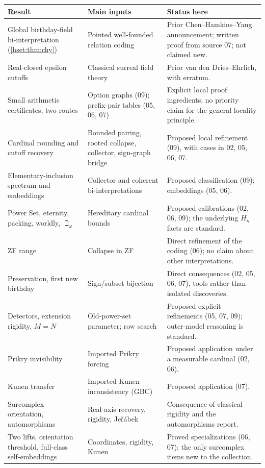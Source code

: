 \documentclass[11pt,letterpaper]{article}
\theoremstyle{definition}
\theoremstyle{remark}
\begin{document}
\begin{longtable}{@{}P{0.26\textwidth}P{0.34\textwidth}P{0.32\textwidth}@{}}
\toprule
Result & Main inputs & Status here\\
\midrule\endhead
Global birthday-field bi-interpretation (\cref{hset:thm:chy}) & Pointed well-founded relation coding & Prior Chen--Hamkins--Yang announcement; written proof from source 07; not claimed new.\\[0.4em]
Real-closed epsilon cutoffs & Classical surreal field theory & Prior van den Dries--Ehrlich, with erratum.\\[0.4em]
Small arithmetic certificates, two routes & Option graphs (09); prefix-pair tables (05, 06, 07) & Explicit local proof ingredients; no priority claim for the general locality principle.\\[0.4em]
Cardinal rounding and cutoff recovery & Bounded pairing, rooted collapse, collector, sign-graph bridge & Proposed local refinement (09), with cases in 02, 05, 06, 07.\\[0.4em]
Elementary-inclusion spectrum and embeddings & Collector and coherent bi-interpretations & Proposed classification (09); embeddings (05, 06).\\[0.4em]
Power Set, eternity, packing, worldly, $\beth_\omega$ & Hereditary cardinal bounds & Proposed calibrations (02, 06, 09); the underlying $H_\kappa$ facts are standard.\\[0.4em]
ZF range & Collapse in ZF & Direct refinement of the coding (06); no claim about other interpretations.\\[0.4em]
Preservation, first new birthday & Sign/subset bijection & Direct consequences (02, 05, 06, 07), tools rather than isolated discoveries.\\[0.4em]
Detectors, extension rigidity, $M=N$ & Old-power-set parameter; row search & Proposed explicit refinements (05, 07, 09); outer-model reasoning is standard.\\[0.4em]
Prikry invisibility & Imported Prikry forcing & Proposed application under a measurable cardinal (02, 06).\\[0.4em]
Kunen transfer & Imported Kunen inconsistency (GBC) & Proposed application (07).\\[0.4em]
Surcomplex orientation, automorphisms & Real-axis recovery, rigidity, Je\v{r}\'abek & Consequence of classical rigidity and the automorphisms report.\\[0.4em]
Two lifts, orientation threshold, full-class self-embeddings & Coordinates, rigidity, Kunen & Proved specializations (06, 07); the only surcomplex items new to the collection.\\
\bottomrule
\end{longtable}
\end{document}
